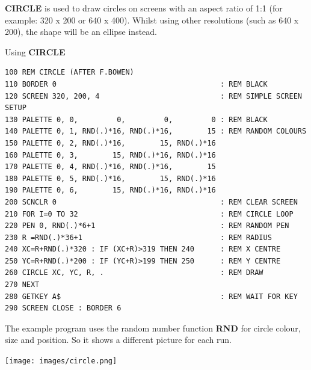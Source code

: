 \begin{description}[leftmargin=2cm,style=nextline]
\item [Remarks:] {\bf CIRCLE} is used to draw circles on screens with an aspect ratio of 1:1 (for example: 320 x 200 or 640 x 400). Whilst using other resolutions (such as 640 x 200), the shape will be an ellipse instead.

\item [Example:] Using {\bf CIRCLE}

\begin{tcolorbox}[colback=black,coltext=white]
\verbatimfont{\codefont}
\begin{verbatim}
100 REM CIRCLE (AFTER F.BOWEN)
110 BORDER 0                                      : REM BLACK
120 SCREEN 320, 200, 4                            : REM SIMPLE SCREEN SETUP
130 PALETTE 0, 0,         0,         0,         0 : REM BLACK
140 PALETTE 0, 1, RND(.)*16, RND(.)*16,        15 : REM RANDOM COLOURS
150 PALETTE 0, 2, RND(.)*16,        15, RND(.)*16
160 PALETTE 0, 3,        15, RND(.)*16, RND(.)*16
170 PALETTE 0, 4, RND(.)*16, RND(.)*16,        15
180 PALETTE 0, 5, RND(.)*16,        15, RND(.)*16
190 PALETTE 0, 6,        15, RND(.)*16, RND(.)*16
200 SCNCLR 0                                      : REM CLEAR SCREEN
210 FOR I=0 TO 32                                 : REM CIRCLE LOOP
220 PEN 0, RND(.)*6+1                             : REM RANDOM PEN
230 R =RND(.)*36+1                                : REM RADIUS
240 XC=R+RND(.)*320 : IF (XC+R)>319 THEN 240      : REM X CENTRE
250 YC=R+RND(.)*200 : IF (YC+R)>199 THEN 250      : REM Y CENTRE
260 CIRCLE XC, YC, R, .                           : REM DRAW
270 NEXT
280 GETKEY A$                                     : REM WAIT FOR KEY
290 SCREEN CLOSE : BORDER 6
\end{verbatim}
\end{tcolorbox}

                 The example program uses the random number function {\bf RND} for circle colour, size and position. So it shows a different picture for each run.

\item \begin{center}\texttt{[image: images/circle.png]}\end{center}

\end{description}


\newpage
